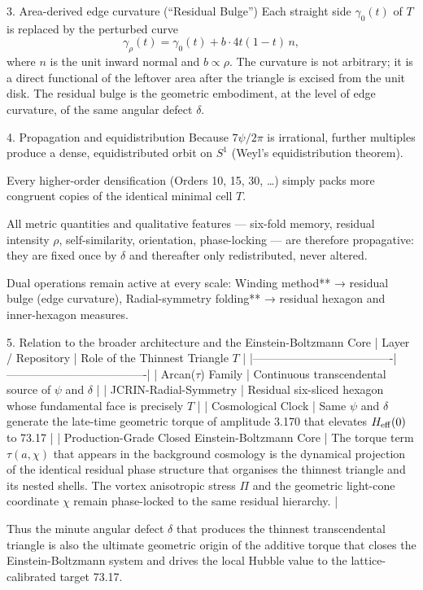 3. Area-derived edge curvature (“Residual Bulge”)
Each straight side \(\gamma_0(t)\) of \(T\) is replaced by the perturbed curve
\[
\gamma_\rho(t) = \gamma_0(t) + b\cdot 4t(1-t)\,n,
\]
where \(n\) is the unit inward normal and \(b \propto \rho\). The curvature is not arbitrary; it is a direct functional of the leftover area after the triangle is excised from the unit disk. The residual bulge is the geometric embodiment, at the level of edge curvature, of the same angular defect \(\delta\).

4. Propagation and equidistribution
Because \(7\psi/2\pi\) is irrational, further multiples produce a dense, equidistributed orbit on \(S^1\) (Weyl’s equidistribution theorem).  

Every higher-order densification (Orders 10, 15, 30, \ldots) simply packs more congruent copies of the identical minimal cell \(T\).  

All metric quantities and qualitative features — six-fold memory, residual intensity \(\rho\), self-similarity, orientation, phase-locking — are therefore propagative: they are fixed once by \(\delta\) and thereafter only redistributed, never altered.

Dual operations remain active at every scale:
Winding method** → residual bulge (edge curvature),
Radial-symmetry folding** → residual hexagon and inner-hexagon measures.

5. Relation to the broader architecture and the Einstein-Boltzmann Core
| Layer / Repository                  | Role of the Thinnest Triangle \(T\) |
|-------------------------------------|-------------------------------------|
| Arcan(\(\tau\)) Family             | Continuous transcendental source of \(\psi\) and \(\delta\) |
| JCRIN-Radial-Symmetry              | Residual six-sliced hexagon whose fundamental face is precisely \(T\) |
| Cosmological Clock                 | Same \(\psi\) and \(\delta\) generate the late-time geometric torque of amplitude 3.170 that elevates \(H_{\rm eff}(0)\) to 73.17 |
| Production-Grade Closed Einstein-Boltzmann Core | The torque term \(\tau(a,\chi)\) that appears in the background cosmology is the dynamical projection of the identical residual phase structure that organises the thinnest triangle and its nested shells. The vortex anisotropic stress \(\Pi\) and the geometric light-cone coordinate \(\chi\) remain phase-locked to the same residual hierarchy. |

Thus the minute angular defect \(\delta\) that produces the thinnest transcendental triangle is also the ultimate geometric origin of the additive torque that closes the Einstein-Boltzmann system and drives the local Hubble value to the lattice-calibrated target 73.17.

